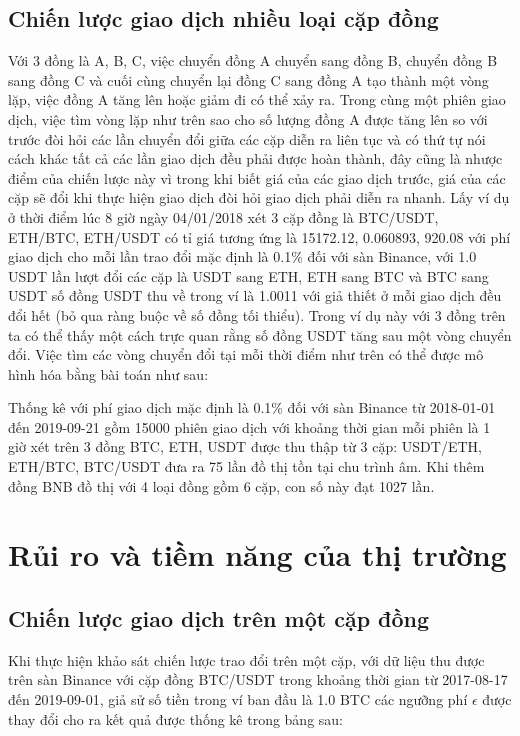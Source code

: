 \subsection{Chiến lược giao dịch nhiều loại cặp đồng}
Với 3 đồng là A, B, C, việc chuyển đồng A chuyển sang đồng B, chuyển đồng B sang đồng C và cuối cùng chuyển lại đồng C sang đồng A tạo thành một vòng lặp, việc đồng A tăng lên hoặc giảm đi có thể xảy ra. Trong cùng một phiên giao dịch, việc tìm vòng lặp như trên sao cho số lượng đồng A được tăng lên so với trước đòi hỏi các lần chuyển đổi giữa các cặp diễn ra liên tục và có thứ tự nói cách khác tất cả các lần giao dịch đều phải được hoàn thành, đây cũng là nhược điểm của chiến lược này vì trong khi biết giá của các giao dịch trước, giá của các cặp sẽ đổi khi thực hiện giao dịch đòi hỏi giao dịch phải diễn ra nhanh.
Lấy ví dụ ở thời điểm lúc 8 giờ ngày 04/01/2018 xét 3 cặp đồng là BTC/USDT, ETH/BTC, ETH/USDT có tỉ giá tương ứng là 15172.12, 0.060893, 920.08 với phí giao dịch cho mỗi lần trao đổi mặc định là 0.1\% đối với sàn Binance, với 1.0 USDT lần lượt đổi các cặp là USDT sang ETH, ETH sang BTC và BTC sang USDT số đồng USDT thu về trong ví là 1.0011 với giả thiết ở mỗi giao dịch đều đổi hết (bỏ qua ràng buộc về số đồng tối thiểu). Trong ví dụ này với 3 đồng trên ta có thể thấy một cách trực quan rằng số đồng USDT tăng sau một vòng chuyển đổi. Việc tìm các vòng chuyển đổi tại mỗi thời điểm như trên có thể  được mô hình hóa bằng bài toán như sau:

Thống kê với phí giao dịch mặc định là 0.1\% đối với sàn Binance từ 2018-01-01 đến 2019-09-21 gồm 15000 phiên giao dịch với khoảng thời gian mỗi phiên là 1 giờ xét trên 3 đồng BTC, ETH, USDT được thu thập từ 3 cặp: USDT/ETH, ETH/BTC, BTC/USDT đưa ra 75 lần đồ thị tồn tại chu trình âm. Khi thêm đồng BNB đồ thị với 4 loại đồng gồm 6 cặp, con số này đạt 1027 lần.

\section{Rủi ro và tiềm năng của thị trường}\label{risk-strategy}
\subsection{Chiến lược giao dịch trên một cặp đồng}
Khi thực hiện khảo sát chiến lược trao đổi trên một cặp, với dữ liệu thu được trên sàn Binance với cặp đồng BTC/USDT trong khoảng thời gian từ 2017-08-17
đến 2019-09-01, giả sử số tiền trong ví ban đầu là 1.0 BTC các ngưỡng phí  $\epsilon$ được thay đổi cho ra kết quả được thống kê trong bảng sau:

